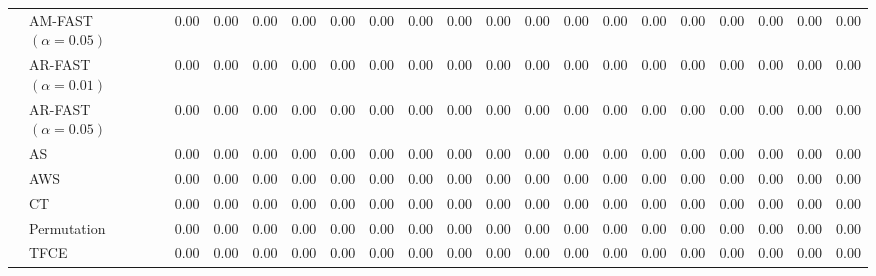 \begin{table}[h]
{\begin{tabular}{|c|l|cccccc|cccccc|cccccc|}
        & AM-FAST$(\alpha=0.05)$ & 0.00 & 0.00 & 0.00 & 0.00 & 0.00 & 0.00 & 0.00 & 0.00 & 0.00 & 0.00 & 0.00 & 0.00 & 0.00 & 0.00 & 0.00 & 0.00 & 0.00 & 0.00 \\
        &  AR-FAST $(\alpha=0.01)$ & 0.00 & 0.00 & 0.00 & 0.00 & 0.00 & 0.00 & 0.00 & 0.00 & 0.00 & 0.00 & 0.00 & 0.00 & 0.00 & 0.00 & 0.00 & 0.00 & 0.00 & 0.00 \\
         &  AR-FAST $(\alpha=0.05)$ & 0.00 & 0.00 & 0.00 & 0.00 & 0.00 & 0.00 & 0.00 & 0.00 & 0.00 & 0.00 & 0.00 & 0.00 & 0.00 & 0.00 & 0.00 & 0.00 & 0.00 & 0.00 \\ 
 & AS & 0.00 & 0.00 & 0.00 & 0.00 & 0.00 & 0.00 & 0.00 & 0.00 & 0.00 & 0.00 & 0.00 & 0.00 & 0.00 & 0.00 & 0.00 & 0.00 & 0.00 & 0.00 \\ 
  & AWS & 0.00 & 0.00 & 0.00 & 0.00 & 0.00 & 0.00 & 0.00 & 0.00 & 0.00 & 0.00 & 0.00 & 0.00 & 0.00 & 0.00 & 0.00 & 0.00 & 0.00 & 0.00 \\ 
  & CT & 0.00 & 0.00 & 0.00 & 0.00 & 0.00 & 0.00 & 0.00 & 0.00 & 0.00 & 0.00 & 0.00 & 0.00 & 0.00 & 0.00 & 0.00 & 0.00 & 0.00 & 0.00 \\ 
 & Permutation & 0.00 & 0.00 & 0.00 & 0.00 & 0.00 & 0.00 & 0.00 & 0.00 & 0.00 & 0.00 & 0.00 & 0.00 & 0.00 & 0.00 & 0.00 & 0.00 & 0.00 & 0.00 \\ 
 & TFCE & 0.00 & 0.00 & 0.00 & 0.00 & 0.00 & 0.00 & 0.00 & 0.00 & 0.00 & 0.00 & 0.00 & 0.00 & 0.00 & 0.00 & 0.00 & 0.00 & 0.00 & 0.00 \\ 
   \hline
      \end{tabular}
    }
  \end{table}

